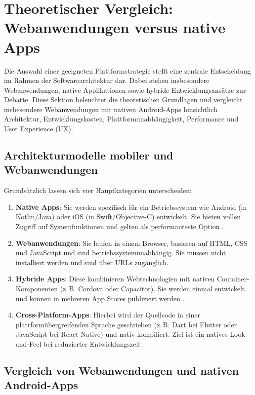 \section{Theoretischer Vergleich: Webanwendungen versus native Apps}
\label{sec:vergleich-webapp-native}

Die Auswahl einer geeigneten Plattformstrategie stellt eine zentrale Entscheidung im Rahmen der Softwarearchitektur dar. Dabei stehen insbesondere Webanwendungen, native Applikationen sowie hybride Entwicklungsansätze zur Debatte. Diese Sektion beleuchtet die theoretischen Grundlagen und vergleicht insbesondere Webanwendungen mit nativen Android-Apps hinsichtlich Architektur, Entwicklungskosten, Plattformunabhängigkeit, Performance und User Experience (UX).

\subsection{Architekturmodelle mobiler und Webanwendungen}

Grundsätzlich lassen sich vier Hauptkategorien unterscheiden:
\begin{enumerate}
	\item \textbf{Native Apps}: Sie werden spezifisch für ein Betriebssystem wie Android (in Kotlin/Java) oder iOS (in Swift/Objective-C) entwickelt. Sie bieten vollen Zugriff auf Systemfunktionen und gelten als performanteste Option \cite{Charland2011}.
	\item \textbf{Webanwendungen}: Sie laufen in einem Browser, basieren auf HTML, CSS und JavaScript und sind betriebssystemunabhängig. Sie müssen nicht installiert werden und sind über URLs zugänglich.
	\item \textbf{Hybride Apps}: Diese kombinieren Webtechnologien mit nativen Con\-tai\-ner-Kom\-po\-nen\-ten (z.\,B. Cordova oder Capacitor). Sie werden einmal entwickelt und können in mehreren App Stores publiziert werden \cite{Charland2011}.
	\item \textbf{Cross-Platform-Apps}: Hierbei wird der Quellcode in einer plattformübergreifenden Sprache geschrieben (z.\,B. Dart bei Flutter oder JavaScript bei React Native) und nativ kompiliert. Ziel ist ein natives Look-and-Feel bei reduzierter Entwicklungszeit \cite{Mahendra2021}.
\end{enumerate}

\subsection{Vergleich von Webanwendungen und nativen Android-Apps}

